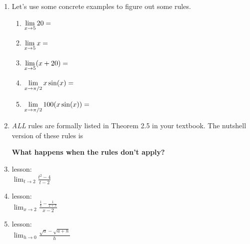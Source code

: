 \documentclass[11pt,fleqn]{article}
\begin{document}
\renewcommand{\headrulewidth}{0pt}
\newcommand{\blank}[1]{\rule{#1}{0.75pt}}
\newcommand{\bc}{\begin{center}}
\newcommand{\ec}{\end{center}}
\renewcommand{\d}{\displaystyle}

\vspace*{-0.7in}

\begin{center}
  
   \end{center}
\begin{enumerate}
\item Let's use some concrete examples to figure out some rules.
	\begin{enumerate}
	\item  $\large{\d \lim_{x \to 5} 20 = }$
	\vfill
	\item $\large{\d \lim_{x \to 5} x = }$
	\vfill
	\item $\large{\d \lim_{x \to 5} (x + 20) = }$
	\vfill
	\item $\large{\d \lim_{x \to \pi/2} x \sin(x)= }$
	\vfill
	\item $\large{\d \lim_{x \to \pi/2} 100(x \sin(x))= }$
	\vfill
	\end{enumerate}
\item \emph{ALL} rules are formally listed in Theorem 2.5 in your textbook. The nutshell version of these rules is
\vspace{2in}

\newpage
\textbf{What happens when the rules don't apply?}
\item lesson:\\

$\displaystyle{\lim_{t \to 2} \frac{t^2-4}{t-2} }$
\vfill

\item lesson:\\

$\displaystyle{\lim_{x \to 2} \frac{\frac{1}{4} - \frac{1}{2+x}}{x-2} }$
\vfill

\item  lesson:\\

$\displaystyle{\lim_{h \to 0 } \frac{\sqrt{a}-\sqrt{a+h}}{h}}$
\vfill
\end{enumerate}
\end{document}

